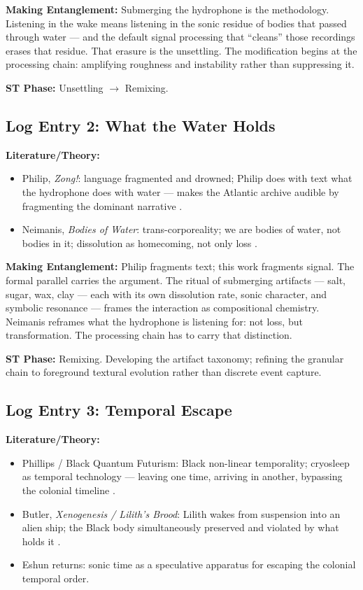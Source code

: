 \noindent\textbf{Making Entanglement:} Submerging the hydrophone is the methodology. Listening in the wake means listening in the sonic residue of bodies that passed through water — and the default signal processing that ``cleans'' those recordings erases that residue. That erasure is the unsettling. The modification begins at the processing chain: amplifying roughness and instability rather than suppressing it.

\noindent\textbf{ST Phase:} Unsettling $\to$ Remixing.

\medskip

\subsection*{Log Entry 2: What the Water Holds}

\noindent\textbf{Literature/Theory:}
\begin{itemize}[noitemsep]
    \item Philip, \textit{Zong!}: language fragmented and drowned; Philip does with text what the hydrophone does with water — makes the Atlantic archive audible by fragmenting the dominant narrative \parencite{Philip_2008}.
    \item Neimanis, \textit{Bodies of Water}: trans-corporeality; we are bodies of water, not bodies in it; dissolution as homecoming, not only loss \parencite{Neimanis_2017}.
\end{itemize}

\noindent\textbf{Making Entanglement:} Philip fragments text; this work fragments signal. The formal parallel carries the argument. The ritual of submerging artifacts — salt, sugar, wax, clay — each with its own dissolution rate, sonic character, and symbolic resonance — frames the interaction as compositional chemistry. Neimanis reframes what the hydrophone is listening for: not loss, but transformation. The processing chain has to carry that distinction.

\noindent\textbf{ST Phase:} Remixing. Developing the artifact taxonomy; refining the granular chain to foreground textural evolution rather than discrete event capture.

\medskip

\subsection*{Log Entry 3: Temporal Escape}

\noindent\textbf{Literature/Theory:}
\begin{itemize}[noitemsep]
    \item Phillips / Black Quantum Futurism: Black non-linear temporality; cryosleep as temporal technology — leaving one time, arriving in another, bypassing the colonial timeline \parencite{Phillips_2015}.
    \item Butler, \textit{Xenogenesis / Lilith's Brood}: Lilith wakes from suspension into an alien ship; the Black body simultaneously preserved and violated by what holds it \parencite{Butler_1987}.
    \item Eshun returns: sonic time as a speculative apparatus for escaping the colonial temporal order.
\end{itemize}

